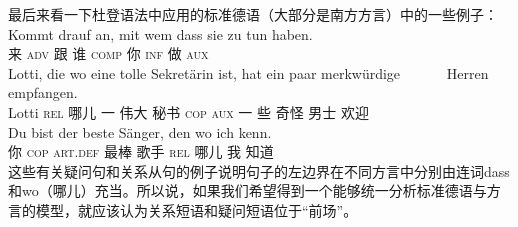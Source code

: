 最后来看一下杜登语法\citep[§1347]{Duden2005-Authors}中应用的标准德语（大部分是南方方言）中的一些例子：
\eal
\ex 
\gll Kommt drauf an, mit wem dass sie zu tun haben.\\
     来 \textsc{adv} \partic{} 跟 谁 \textsc{comp} 你 \textsc{inf} 做 \textsc{aux}\\
\zl
\eal
\ex 
\gll Lotti, die wo eine tolle Sekretärin ist, hat ein paar merkwürdige~~~~~~ Herren empfangen.\\
    Lotti  \textsc{rel} 哪儿 一 伟大 秘书 \textsc{cop} \textsc{aux} 一 些 奇怪 男士 欢迎\\
\ex 
\gll Du bist der beste Sänger, den wo ich kenn.\\
     你 \textsc{cop} \textsc{art}.\textsc{def} 最棒 歌手   \textsc{rel} 哪儿 我 知道\\
\zl
这些有关疑问句和关系从句的例子说明句子的左边界在不同方言中分别由连词dass和wo（哪儿）充当。所以说，如果我们希望得到一个能够统一分析标准德语与方言的模型，就应该认为关系短语和疑问短语位于“前场”。

